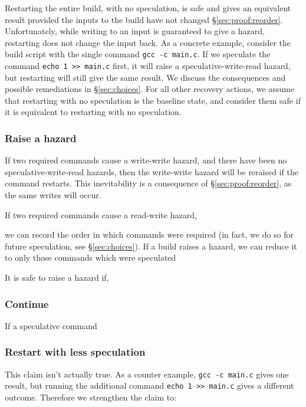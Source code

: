 Restarting the entire build, with no speculation, is safe and gives an equivalent result provided the inputs to the build have not changed \S\ref{sec:proof:reorder}. Unfortunately, while writing to an input is guaranteed to give a hazard, restarting does not change the input back. As a concrete example, consider the build script with the single command \texttt{gcc -c main.c}. If we speculate the command \texttt{echo 1 >> main.c} first, it will raise a speculative-write-read hazard, but restarting will still give the same result. We discuss the consequences and possible remediations in \S\ref{sec:choices}. For all other recovery actions, we assume that restarting with no speculation is the baseline state, and consider them safe if it is equivalent to restarting with no speculation.

\subsubsection{Raise a hazard}

If two required commands cause a write-write hazard, and there have been no speculative-write-read hazards, then the write-write hazard will be reraised if the command restarts. This inevitability is a consequence of \S\ref{sec:proof:reorder}, as the same writes will occur.

If two required commands cause a read-write hazard,




 we can record the order in which commands were required (in fact, we do so for future speculation, see \S\ref{sec:choices}). If a build raises a hazard, we can reduce it to only those commands which were speculated

It is safe to raise a hazard if,


\subsubsection{Continue}


If a speculative command

\subsubsection{Restart with less speculation}

 This claim isn't actually true. As a counter example, \texttt{gcc -c main.c} gives one result, but running the additional command \texttt{echo 1 >> main.c} gives a different outcome. Therefore we strengthen the claim to:



